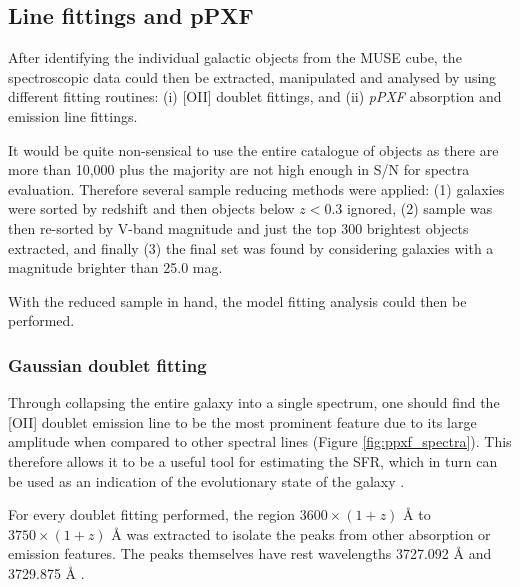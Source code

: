 \documentclass[12pt, twocolumn]{revtex4-1}    %
\begin{document}
\subsection*{Line fittings and pPXF} 

After identifying the individual galactic objects from the MUSE cube, the spectroscopic data could then be extracted, manipulated and analysed by using different fitting routines: (i) [OII] doublet fittings, and (ii) \textit{pPXF} absorption and emission line fittings.


It would be quite non-sensical to use the entire catalogue of objects as there are more than 10,000 plus the majority are not high enough in S/N for spectra evaluation. Therefore several sample reducing methods were applied: (1) galaxies were sorted by redshift and then objects below $z<0.3$ ignored, (2) sample was then re-sorted by V-band magnitude and just the top 300 brightest objects extracted, and finally (3) the final set was found by considering galaxies with a magnitude brighter than 25.0 mag. 

With the reduced sample in hand, the model fitting analysis could then be performed.





\subsubsection*{Gaussian doublet fitting}

Through collapsing the entire galaxy into a single spectrum, one should find the [OII] doublet emission line to be the most prominent feature due to its large amplitude when compared to other spectral lines (Figure \ref{fig:ppxf_spectra}). This therefore allows it to be a useful tool for estimating the SFR, which in turn can be used as an indication of the evolutionary state of the galaxy \citep{maddox_oxygen}.

For every doublet fitting performed, the region $3600\times(1+z)$ {\AA} to $3750\times(1+z)$ {\AA} was extracted to isolate the peaks from other absorption or emission features. The peaks themselves have rest wavelengths 3727.092 {\AA} and 3729.875 {\AA} \citep{sdss_lines}. 
\end{document}
